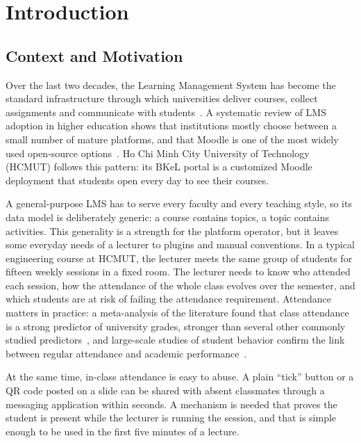 \section{Introduction}
\label{ch:intro}

\subsection{Context and Motivation}

Over the last two decades, the Learning Management System has become the standard infrastructure through which universities deliver courses, collect assignments and communicate with students~\cite{ellis2009field}. A systematic review of LMS adoption in higher education shows that institutions mostly choose between a small number of mature platforms, and that Moodle is one of the most widely used open-source options~\cite{kasim2016choosing, dougiamas2003moodle}. Ho Chi Minh City University of Technology (HCMUT) follows this pattern: its BKeL portal is a customized Moodle deployment that students open every day to see their courses.

A general-purpose LMS has to serve every faculty and every teaching style, so its data model is deliberately generic: a course contains topics, a topic contains activities. This generality is a strength for the platform operator, but it leaves some everyday needs of a lecturer to plugins and manual conventions. In a typical engineering course at HCMUT, the lecturer meets the same group of students for fifteen weekly sessions in a fixed room. The lecturer needs to know who attended each session, how the attendance of the whole class evolves over the semester, and which students are at risk of failing the attendance requirement. Attendance matters in practice: a meta-analysis of the literature found that class attendance is a strong predictor of university grades, stronger than several other commonly studied predictors~\cite{crede2010class}, and large-scale studies of student behavior confirm the link between regular attendance and academic performance~\cite{kassarnig2018academic}.

At the same time, in-class attendance is easy to abuse. A plain ``tick'' button or a QR code posted on a slide can be shared with absent classmates through a messaging application within seconds. A mechanism is needed that proves the student is present while the lecturer is running the session, and that is simple enough to be used in the first five minutes of a lecture.

